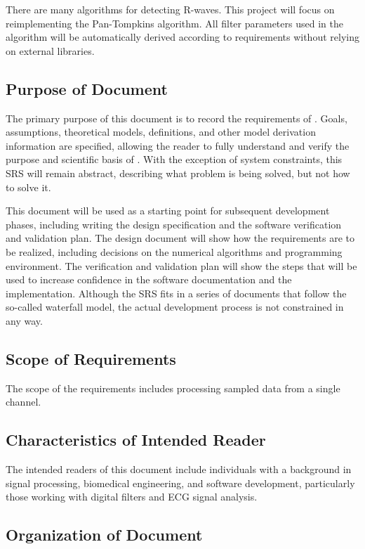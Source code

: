 \documentclass[12pt]{article}
\begin{document}
There are many algorithms for detecting R-waves.  This project will focus on
reimplementing the Pan-Tompkins\cite{4122029} algorithm.  All filter parameters
used in the algorithm will be automatically derived according to requirements
without relying on external libraries.

\subsection{Purpose of Document}

The primary purpose of this document is to record the requirements of \progname.
Goals, assumptions, theoretical models, definitions, and other model derivation
information are specified, allowing the reader to fully understand and verify
the purpose and scientific basis of \progname.  With the exception of system
constraints, this SRS will remain abstract, describing what problem is being
solved, but not how to solve it.

This document will be used as a starting point for subsequent development
phases, including writing the design specification and the software verification
and validation plan.  The design document will show how the requirements are to
be realized, including decisions on the numerical algorithms and programming
environment.  The verification and validation plan will show the steps that will
be used to increase confidence in the software documentation and the
implementation.  Although the SRS fits in a series of documents that follow the
so-called waterfall model, the actual development process is not constrained in
any way.

\subsection{Scope of Requirements} 

The scope of the requirements includes processing sampled data from a single
channel.

\subsection{Characteristics of Intended Reader} \label{sec_IntendedReader}

The intended readers of this document include individuals with a background in
signal processing, biomedical engineering, and software development,
particularly those working with digital filters and ECG signal analysis.

\subsection{Organization of Document}
\end{document}
